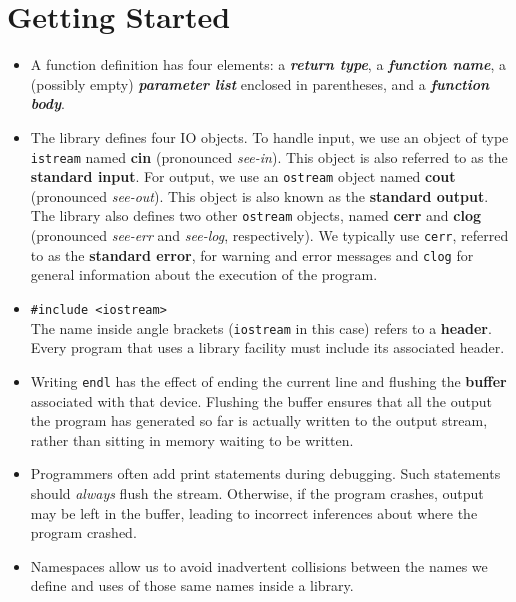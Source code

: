 \section{Getting Started}
\begin{itemize}

\item A function definition has four elements: a \textbf{\textit{return type}}, a \textbf{\textit{function name}}, a (possibly empty) \textbf{\textit{parameter list}} enclosed in parentheses, and a \textbf{\textit{function body}}.

\item The library defines four IO objects. To handle input, we use an object of type \texttt{istream} named \textbf{cin} (pronounced \textit{see-in}). This object is also referred to as the \textbf{standard input}. For output, we use an \texttt{ostream} object named \textbf{cout} (pronounced \textit{see-out}). This object is also known as the \textbf{standard output}. The library also defines two other \texttt{ostream} objects, named \textbf{cerr} and \textbf{clog} (pronounced \textit{see-err} and \textit{see-log}, respectively). We typically use \texttt{cerr}, referred to as the \textbf{standard error}, for warning and error messages and \texttt{clog} for general information about the execution of the program.

\item \hspace*{1em}\texttt{\#include <iostream>}\\The name inside angle brackets (\texttt{iostream} in this case) refers to a \textbf{header}. Every program that uses a library facility must include its associated header.

\item Writing \texttt{endl} has the effect of ending the current line and flushing the \textbf{buffer} associated with that device. Flushing the buffer ensures that all the output the program has generated so far is actually written to the output stream, rather than sitting in memory waiting to be written.

\item Programmers often add print statements during debugging. Such statements should \textit{always} flush the stream. Otherwise, if the program crashes, output may be left in the buffer, leading to incorrect inferences about where the program crashed.

\item Namespaces allow us to avoid inadvertent collisions between the names we define and uses of those same names inside a library.


\end{itemize}
